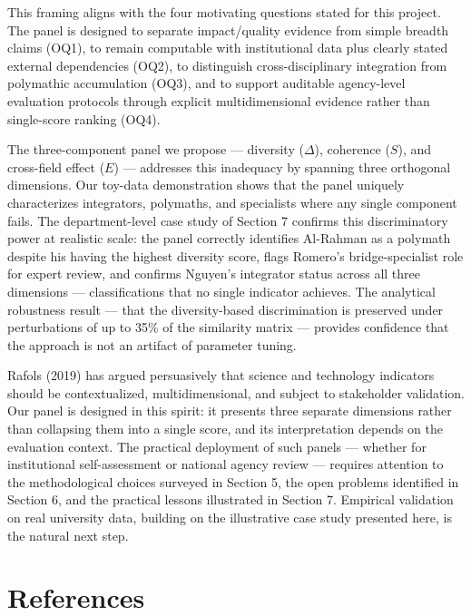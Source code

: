 \documentclass[
]{article}
\begin{document}
This framing aligns with the four motivating questions stated for this
project. The panel is designed to separate impact/quality evidence from
simple breadth claims (OQ1), to remain computable with institutional
data plus clearly stated external dependencies (OQ2), to distinguish
cross-disciplinary integration from polymathic accumulation (OQ3), and
to support auditable agency-level evaluation protocols through explicit
multidimensional evidence rather than single-score ranking (OQ4).

The three-component panel we propose --- diversity (\(\Delta\)),
coherence (\(S\)), and cross-field effect (\(E\)) --- addresses this
inadequacy by spanning three orthogonal dimensions. Our toy-data
demonstration shows that the panel uniquely characterizes integrators,
polymaths, and specialists where any single component fails. The
department-level case study of Section 7 confirms this discriminatory
power at realistic scale: the panel correctly identifies Al-Rahman as a
polymath despite his having the highest diversity score, flags Romero's
bridge-specialist role for expert review, and confirms Nguyen's
integrator status across all three dimensions --- classifications that
no single indicator achieves. The analytical robustness result --- that
the diversity-based discrimination is preserved under perturbations of
up to 35\% of the similarity matrix --- provides confidence that the
approach is not an artifact of parameter tuning.

Rafols (2019) has argued persuasively that science and technology
indicators should be contextualized, multidimensional, and subject to
stakeholder validation. Our panel is designed in this spirit: it
presents three separate dimensions rather than collapsing them into a
single score, and its interpretation depends on the evaluation context.
The practical deployment of such panels --- whether for institutional
self-assessment or national agency review --- requires attention to the
methodological choices surveyed in Section 5, the open problems
identified in Section 6, and the practical lessons illustrated in
Section 7. Empirical validation on real university data, building on the
illustrative case study presented here, is the natural next step.

\hypertarget{references}{%
\section{References}\label{references}}
\end{document}
